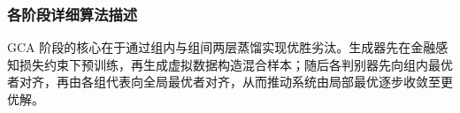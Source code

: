 
\subsubsection{各阶段详细算法描述}
GCA 阶段的核心在于通过组内与组间两层蒸馏实现优胜劣汰。生成器先在金融感知损失约束下预训练，再生成虚拟数据构造混合样本；随后各判别器先向组内最优者对齐，再由各组代表向全局最优者对齐，从而推动系统由局部最优逐步收敛至更优解。

